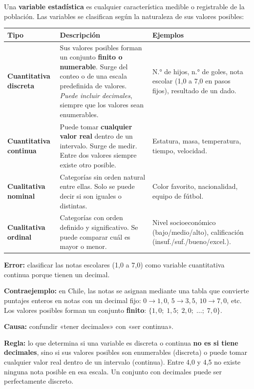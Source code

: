 \documentclass[11pt, letterpaper]{article}
\begin{document}
\begin{tcolorbox}[importantbox, title={Clasificación de variables}]
Una \textbf{variable estadística} es cualquier característica medible o registrable de la población. Las variables se clasifican según la naturaleza de sus valores posibles:

\medskip
\begin{center}
\renewcommand{\arraystretch}{1.35}
\begin{tabular}{p{3cm} p{4.5cm} p{4.5cm}}
\toprule
\textbf{Tipo} & \textbf{Descripción} & \textbf{Ejemplos}\\
\midrule
\textbf{Cuantitativa discreta} & Sus valores posibles forman un conjunto \textbf{finito o numerable}. Surge del conteo o de una escala predefinida de valores. \textit{Puede incluir decimales}, siempre que los valores sean enumerables. & N.° de hijos, n.° de goles, nota escolar (1{,}0 a 7{,}0 en pasos fijos), resultado de un dado.\\[4pt]
\textbf{Cuantitativa continua} & Puede tomar \textbf{cualquier valor real} dentro de un intervalo. Surge de medir. Entre dos valores siempre existe otro posible. & Estatura, masa, temperatura, tiempo, velocidad.\\[4pt]
\textbf{Cualitativa nominal} & Categorías sin orden natural entre ellas. Solo se puede decir si son iguales o distintas. & Color favorito, nacionalidad, equipo de fútbol.\\[4pt]
\textbf{Cualitativa ordinal} & Categorías con orden definido y significativo. Se puede comparar cuál es mayor o menor. & Nivel socioeconómico (bajo/medio/alto), calificación (insuf./suf./bueno/excel.).\\
\bottomrule
\end{tabular}
\end{center}
\end{tcolorbox}

\begin{tcolorbox}[warningbox, title={Error frecuente: «tiene decimales, entonces es continua»}]
\textbf{Error:} clasificar las notas escolares (1{,}0 a 7{,}0) como variable cuantitativa continua porque tienen un decimal.

\medskip

\textbf{Contraejemplo:} en Chile, las notas se asignan mediante una tabla que convierte puntajes enteros en notas con un decimal fijo: $0 \to 1{,}0$, $5 \to 3{,}5$, $10 \to 7{,}0$, etc. Los valores posibles forman un conjunto \textbf{finito}: $\{1{,}0;\; 1{,}5;\; 2{,}0;\; \ldots;\; 7{,}0\}$.

\medskip

\textbf{Causa:} confundir «tener decimales» con «ser continua».

\medskip

\textbf{Regla:} lo que determina si una variable es discreta o continua \textbf{no es si tiene decimales}, sino si sus valores posibles son enumerables (discreta) o puede tomar cualquier valor real dentro de un intervalo (continua). Entre 4{,}0 y 4{,}5 no existe ninguna nota posible en esa escala. Un conjunto con decimales puede ser perfectamente discreto.
\end{tcolorbox}
\end{document}
